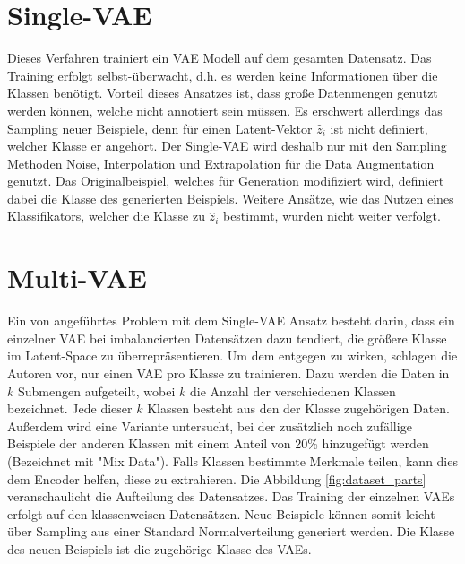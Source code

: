 \section{Single-VAE}
Dieses Verfahren trainiert ein VAE Modell auf dem gesamten Datensatz. Das Training erfolgt selbst-überwacht, d.h. es werden keine Informationen über die Klassen benötigt. Vorteil dieses Ansatzes ist, dass große Datenmengen genutzt werden können, welche nicht annotiert sein müssen. Es erschwert allerdings das Sampling neuer Beispiele, denn für einen Latent-Vektor $\hat{z}_i$ ist nicht definiert, welcher Klasse er angehört. Der Single-VAE wird deshalb nur mit den Sampling Methoden Noise, Interpolation und Extrapolation für die Data Augmentation genutzt. Das Originalbeispiel, welches für Generation modifiziert wird, definiert dabei die Klasse des generierten Beispiels. Weitere Ansätze, wie das Nutzen eines Klassifikators, welcher die Klasse zu $\hat{z}_i$ bestimmt, wurden nicht weiter verfolgt.



\section{Multi-VAE}\label{sec:multi-vae-intro}
Ein von \cite{Moreno-Barea2020} angeführtes Problem mit dem Single-VAE Ansatz besteht darin, dass ein einzelner VAE bei imbalancierten Datensätzen dazu tendiert, die größere Klasse im Latent-Space zu überrepräsentieren. Um dem entgegen zu wirken, schlagen die Autoren vor, nur einen VAE pro Klasse zu trainieren. Dazu werden die Daten in $k$ Submengen aufgeteilt, wobei $k$ die Anzahl der verschiedenen Klassen bezeichnet. Jede dieser $k$ Klassen besteht aus den der Klasse zugehörigen Daten. Außerdem wird eine Variante untersucht, bei der zusätzlich noch zufällige Beispiele der anderen Klassen mit einem Anteil von 20\% hinzugefügt werden (Bezeichnet mit "Mix Data"). Falls Klassen bestimmte Merkmale teilen, kann dies dem Encoder helfen, diese zu extrahieren. Die Abbildung \ref{fig:dataset_parts} veranschaulicht die Aufteilung des Datensatzes. Das Training der einzelnen VAEs erfolgt auf den klassenweisen Datensätzen. Neue Beispiele können somit leicht über Sampling aus einer Standard Normalverteilung generiert werden. Die Klasse des neuen Beispiels ist die zugehörige Klasse des VAEs.

